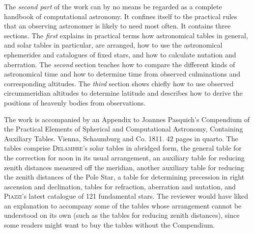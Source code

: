 The \emph{second part} of the work can by no means be regarded as a complete handbook of computational astronomy. It confines itself to the practical rules that an observing astronomer is likely to need most often. It contains three sections. The \emph{first} explains in practical terms how astronomical tables in general, and solar tables in particular, are arranged, how to use the astronomical ephemerides and catalogues of fixed stars, and how to calculate nutation and aberration. The \emph{second} section teaches how to compare the different kinds of astronomical time and how to determine time from observed culminations and corresponding altitudes. The \emph{third} section shows chiefly how to use observed circummeridian altitudes to determine latitude and describes how to derive the positions of heavenly bodies from observations.

The work is accompanied by an Appendix to Joannes Pasquich's Compendium of the Practical Elements of Spherical and Computational Astronomy, Containing Auxiliary Tables. Vienna, Schaumburg and Co. 1811. 42 pages in quarto. The tables comprise \textsc{Delambre}'s solar tables in abridged form, the general table for the correction for noon in its usual arrangement, an auxiliary table for reducing zenith distances measured off the meridian, another auxiliary table for reducing the zenith distances of the Pole Star, a table for determining precession in right ascension and declination, tables for refraction, aberration and nutation, and \textsc{Piazzi}'s latest catalogue of 121 fundamental stars. The reviewer would have liked an explanation to accompany some of the tables whose arrangement cannot be understood on its own (such as the tables for reducing zenith distances), since some readers might want to buy the tables without the Compendium.
